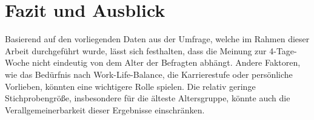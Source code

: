 \chapter{Fazit und Ausblick}


Basierend auf den vorliegenden Daten aus der Umfrage, welche im Rahmen dieser Arbeit durchgeführt wurde, 
lässt sich festhalten, dass die Meinung zur 4-Tage-Woche nicht eindeutig von dem Alter der Befragten abhängt. 
Andere Faktoren, wie das Bedürfnis nach Work-Life-Balance, die Karrierestufe oder persönliche Vorlieben, 
könnten eine wichtigere Rolle spielen. Die relativ geringe Stichprobengröße, insbesondere für die älteste 
Altersgruppe, könnte auch die Verallgemeinerbarkeit dieser Ergebnisse einschränken.